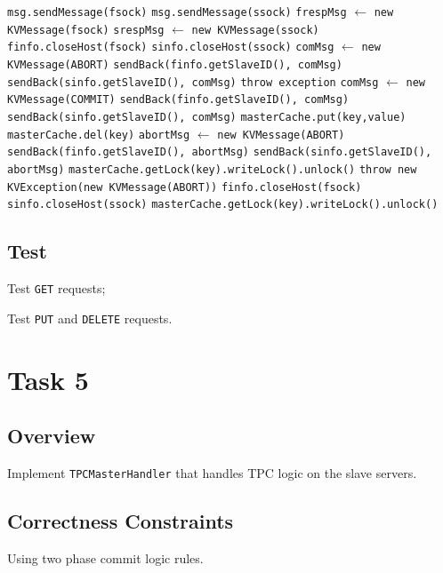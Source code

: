 \documentclass{article}
\begin{document}
\begin{bframe}
\begin{algorithmic}
    	\State \texttt{msg.sendMessage(fsock)}
			\State \texttt{msg.sendMessage(ssock)}
			\State \texttt{frespMsg} $\leftarrow$ \texttt{new KVMessage(fsock)}
			\State \texttt{srespMsg} $\leftarrow$ \texttt{new KVMessage(ssock)}
				\State \texttt{finfo.closeHost(fsock)}
				\State \texttt{sinfo.closeHost(ssock)}
				\State \texttt{comMsg} $\leftarrow$ \texttt{new KVMessage(ABORT)}
				\State \texttt{sendBack(finfo.getSlaveID(), comMsg)}
				\State \texttt{sendBack(sinfo.getSlaveID(), comMsg)}
				\State \texttt{throw exception}
			\EndIf
				\State \texttt{comMsg} $\leftarrow$ \texttt{new KVMessage(COMMIT)}
				\State \texttt{sendBack(finfo.getSlaveID(), comMsg)}
				\State \texttt{sendBack(sinfo.getSlaveID(), comMsg)}
					\State \texttt{masterCache.put(key,value)}
				\Else
					\State \texttt{masterCache.del(key)}
				\EndIf
			\Else
	    	\State \texttt{abortMsg} $\leftarrow$ \texttt{new KVMessage(ABORT)}
	    	\State \texttt{sendBack(finfo.getSlaveID(), abortMsg)}
    		\State \texttt{sendBack(sinfo.getSlaveID(), abortMsg)}
				\State \texttt{masterCache.getLock(key).writeLock().unlock()}
				\State \texttt{throw new KVException(new KVMessage(ABORT))}
    	\EndIf
			\State \texttt{finfo.closeHost(fsock)}
			\State \texttt{sinfo.closeHost(ssock)}
			\State \texttt{masterCache.getLock(key).writeLock().unlock()}
		\EndProcedure
	\end{algorithmic}
\end{bframe}
\subsection{Test}
\begin{compactitem}
	\item Test \texttt{GET} requests;
	\item Test \texttt{PUT} and \texttt{DELETE} requests.
\end{compactitem}

\section{Task 5}
\subsection{Overview}
Implement \texttt{TPCMasterHandler} that handles TPC logic on the slave servers.
\subsection{Correctness Constraints}
\begin{compactitem}
	\item Using two phase commit logic rules.
\end{compactitem}
\end{document}
